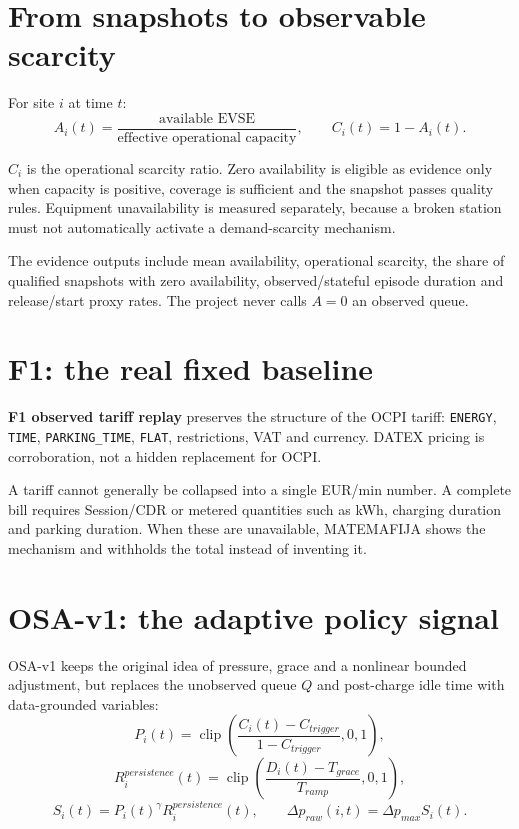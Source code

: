 \documentclass[11pt,a4paper]{article}
\newcommand{\term}[1]{\textbf{#1}}
\newcommand{\code}[1]{\texttt{#1}}
\begin{document}
\section{From snapshots to observable scarcity}

For site $i$ at time $t$:
\[
A_i(t)=\frac{\text{available EVSE}}{\text{effective operational capacity}},
\qquad
C_i(t)=1-A_i(t).
\]

$C_i$ is the operational scarcity ratio. Zero availability is eligible as evidence only when capacity is positive, coverage is sufficient and the snapshot passes quality rules. Equipment unavailability is measured separately, because a broken station must not automatically activate a demand-scarcity mechanism.

The evidence outputs include mean availability, operational scarcity, the share of qualified snapshots with zero availability, observed/stateful episode duration and release/start proxy rates. The project never calls $A=0$ an observed queue.

\section{F1: the real fixed baseline}

\term{F1 observed tariff replay} preserves the structure of the OCPI tariff: \code{ENERGY}, \code{TIME}, \code{PARKING\_TIME}, \code{FLAT}, restrictions, VAT and currency. DATEX pricing is corroboration, not a hidden replacement for OCPI.

A tariff cannot generally be collapsed into a single EUR/min number. A complete bill requires Session/CDR or metered quantities such as kWh, charging duration and parking duration. When these are unavailable, MATEMAFIJA shows the mechanism and withholds the total instead of inventing it.

\section{OSA-v1: the adaptive policy signal}

OSA-v1 keeps the original idea of pressure, grace and a nonlinear bounded adjustment, but replaces the unobserved queue $Q$ and post-charge idle time with data-grounded variables:
\[
P_i(t)=\operatorname{clip}\!\left(
\frac{C_i(t)-C_{trigger}}{1-C_{trigger}},0,1
\right),
\]
\[
R_i^{persistence}(t)=\operatorname{clip}\!\left(
\frac{D_i(t)-T_{grace}}{T_{ramp}},0,1
\right),
\]
\[
S_i(t)=P_i(t)^\gamma R_i^{persistence}(t),
\qquad
\Delta p_{raw}(i,t)=\Delta p_{max}S_i(t).
\]
\end{document}
